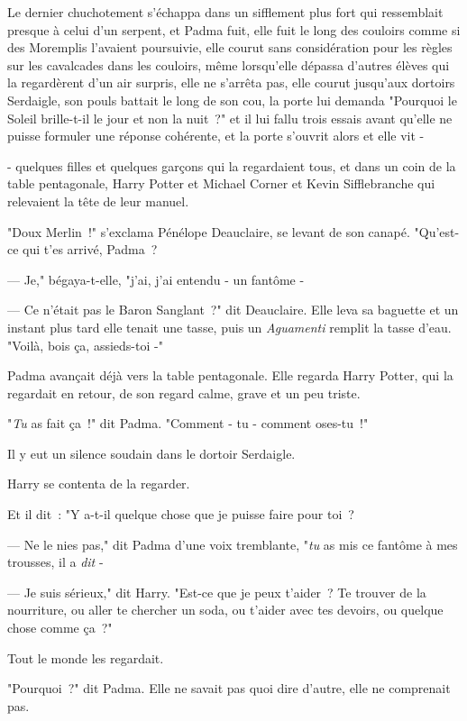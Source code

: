 Le dernier chuchotement s'échappa dans un sifflement plus fort qui ressemblait presque à celui d'un serpent, et Padma fuit, elle fuit le long des couloirs comme si des Moremplis l'avaient poursuivie, elle courut sans considération pour les règles sur les cavalcades dans les couloirs, même lorsqu'elle dépassa d'autres élèves qui la regardèrent d'un air surpris, elle ne s'arrêta pas, elle courut jusqu'aux dortoirs Serdaigle, son pouls battait le long de son cou, la porte lui demanda "Pourquoi le Soleil brille-t-il le jour et non la nuit~?" et il lui fallu trois essais avant qu'elle ne puisse formuler une réponse cohérente, et la porte s'ouvrit alors et elle vit -

- quelques filles et quelques garçons qui la regardaient tous, et dans un coin de la table pentagonale, Harry Potter et Michael Corner et Kevin Sifflebranche qui relevaient la tête de leur manuel.

"Doux Merlin~!" s'exclama Pénélope Deauclaire, se levant de son canapé. "Qu'est-ce qui t'es arrivé, Padma~?

--- Je," bégaya-t-elle, "j'ai, j'ai entendu - un fantôme -

--- Ce n'était pas le Baron Sanglant~?" dit Deauclaire. Elle leva sa baguette et un instant plus tard elle tenait une tasse, puis un \emph{Aguamenti} remplit la tasse d'eau. "Voilà, bois ça, assieds-toi -"

Padma avançait déjà vers la table pentagonale. Elle regarda Harry Potter, qui la regardait en retour, de son regard calme, grave et un peu triste.

"\emph{Tu} as fait ça~!" dit Padma. "Comment - tu - comment oses-tu~!"

Il y eut un silence soudain dans le dortoir Serdaigle.

Harry se contenta de la regarder.

Et il dit~: "Y a-t-il quelque chose que je puisse faire pour toi~?

--- Ne le nies pas," dit Padma d'une voix tremblante, "\emph{tu} as mis ce fantôme à mes trousses, il a \emph{dit} -

--- Je suis sérieux," dit Harry. "Est-ce que je peux t'aider~? Te trouver de la nourriture, ou aller te chercher un soda, ou t'aider avec tes devoirs, ou quelque chose comme ça~?"

Tout le monde les regardait.

"Pourquoi~?" dit Padma. Elle ne savait pas quoi dire d'autre, elle ne comprenait pas.

